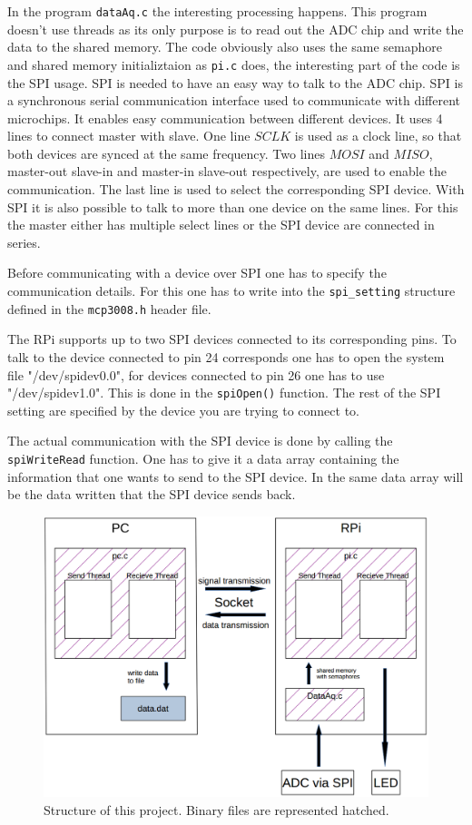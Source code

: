 \documentclass[12pt,paper=a4,twoside]{scrartcl}
\numberwithin{equation}{section}
\begin{document}
In the program \verb+dataAq.c+ the interesting processing happens. This program doesn't use threads as its only purpose is to read out the ADC chip and write the data to the shared memory. The code obviously also uses the same semaphore and shared memory initializtaion as \verb+pi.c+ does, the interesting part of the code is the SPI usage. SPI is needed to have an easy way to talk to the ADC chip. SPI is a synchronous serial communication interface used to communicate with different microchips. It enables easy communication between different devices. It uses 4 lines to connect master with slave. One line $SCLK$ is used as a clock line, so that both devices are synced at the same frequency. Two lines $MOSI$ and $MISO$, master-out slave-in and master-in slave-out respectively, are used to enable the communication. The last line is used to select the corresponding SPI device. With SPI it is also possible to talk to more than one device on the same lines. For this the master either has multiple select lines or the SPI device are connected in series.

Before communicating with a device over SPI one has to specify the communication details.
For this one has to write into the \verb+spi_setting+ structure defined in the \verb+mcp3008.h+ header file.


The RPi supports up to two SPI devices connected to its corresponding pins. To talk to the device connected to pin 24 corresponds one has to open the system file "/dev/spidev0.0", for devices connected to pin 26 one has to use "/dev/spidev1.0". This is done in the \verb+spiOpen()+ function. The rest of the SPI setting are specified by the device you are trying to connect to.

The actual communication with the SPI device is done by calling the \verb+spiWriteRead+ function. One has to give it a data array containing the information that one wants to send to the SPI device. In the same data array will be the data written that the SPI device sends back.


\begin{figure}
\centering
\includegraphics[scale=0.4]{schematic.png}
\caption{Structure of this project. Binary files are represented hatched.}
\label{schematic}
\end{figure}
\end{document}
